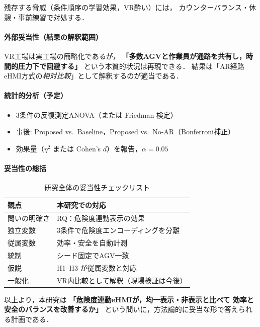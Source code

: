 残存する脅威（条件順序の学習効果，VR酔い）には，
カウンターバランス・休憩・事前練習で対処する．

\paragraph{外部妥当性（結果の解釈範囲）}

VR工場は実工場の簡略化であるが，
\textbf{「多数AGVと作業員が通路を共有し，時間的圧力下で回避する」}
という本質的状況は再現できる．
結果は「AR経路eHMI方式の\emph{相対比較}」として解釈するのが適当である．

\paragraph{統計的分析（予定）}

\begin{itemize}[leftmargin=2em]
  \item 3条件の反復測定ANOVA（または Friedman 検定）
  \item 事後: Proposed vs.\ Baseline，Proposed vs.\ No-AR（Bonferroni補正）
  \item 効果量（$\eta^2$ または Cohen's $d$）を報告，$\alpha=0.05$
\end{itemize}

\paragraph{妥当性の総括}

\begin{table}[htbp]
  \centering
  \caption{研究全体の妥当性チェックリスト}
  \label{tab:validity}
  \begin{tabular}{p{2.8cm}p{9.8cm}}
    \toprule
    観点 & 本研究での対応 \\
    \midrule
    問いの明確さ & RQ：危険度連動表示の効果 \\
    独立変数 & 3条件で危険度エンコーディングを分離 \\
    従属変数 & 効率・安全を自動計測 \\
    統制 & シード固定でAGV一致 \\
    仮説 & H1--H3 が従属変数と対応 \\
    一般化 & VR内比較として解釈（現場検証は今後） \\
    \bottomrule
  \end{tabular}
\end{table}

以上より，本研究は
\textbf{「危険度連動eHMIが，均一表示・非表示と比べて
効率と安全のバランスを改善するか」}
という問いに，方法論的に妥当な形で答えられる計画である．
